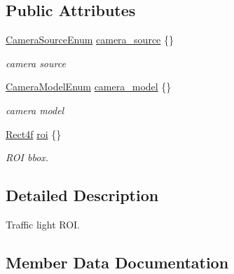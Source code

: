\subsection*{Public Attributes}
\begin{DoxyCompactItemize}
\item 
\hyperlink{structmaf__perception__interface_1_1CameraSourceEnum}{Camera\+Source\+Enum} \hyperlink{structmaf__perception__interface_1_1TrafficLightROI_a8114f75f8c3feab954f04c4064cd3bbc}{camera\+\_\+source} \{\}
\begin{DoxyCompactList}\small\item\em camera source \end{DoxyCompactList}\item 
\hyperlink{structmaf__perception__interface_1_1CameraModelEnum}{Camera\+Model\+Enum} \hyperlink{structmaf__perception__interface_1_1TrafficLightROI_a18ac2601ab6e8660d90a0625352a0fb9}{camera\+\_\+model} \{\}
\begin{DoxyCompactList}\small\item\em camera model \end{DoxyCompactList}\item 
\hyperlink{structmaf__perception__interface_1_1Rect4f}{Rect4f} \hyperlink{structmaf__perception__interface_1_1TrafficLightROI_a6f9356dea3ea5ff64d1da44609b6391e}{roi} \{\}
\begin{DoxyCompactList}\small\item\em R\+OI bbox. \end{DoxyCompactList}\end{DoxyCompactItemize}


\subsection{Detailed Description}
Traffic light R\+OI. 

\subsection{Member Data Documentation}
\mbox{\label{structmaf__perception__interface_1_1TrafficLightROI_a18ac2601ab6e8660d90a0625352a0fb9}} 
